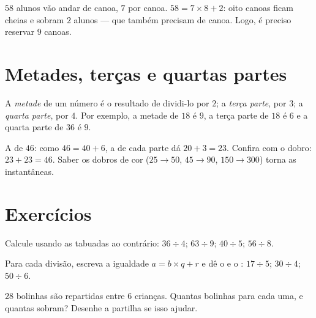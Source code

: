 \begin{example}\label{ex:g3:division:interpret}
$58$ alunos vão andar de canoa, $7$ por canoa. $58 = 7 \times 8 +
2$: oito canoas ficam cheias e sobram $2$ alunos --- que também
precisam de canoa. Logo, é preciso reservar $9$ canoas.
\end{example}

\section{Metades, terças e quartas partes}

\begin{definition}\label{def:g3:division:half}
A \emph{metade} de um número é o resultado de dividi-lo por $2$; a
\emph{terça parte}, por $3$; a \emph{quarta parte}, por $4$. Por
exemplo, a metade de $18$ é $9$, a terça parte de $18$ é $6$ e a
quarta parte de $36$ é $9$.
\end{definition}

\begin{example}\label{ex:g3:division:double}
A  de $46$: como $46 = 40 + 6$, a  de cada parte dá
$20 + 3 = 23$. Confira com o dobro: $23 + 23 = 46$. Saber os dobros
de cor ($25 \to 50$, $45 \to 90$, $150 \to 300$) torna as 
instantâneas.
\end{example}

\section{Exercícios}

\begin{exercise}[$\star$]\label{exo:g3:division:1}
Calcule usando as tabuadas ao contrário: $36 \div 4$; \quad
$63 \div 9$; \quad $40 \div 5$; \quad $56 \div 8$.
\end{exercise}

\begin{exercise}[$\star$]\label{exo:g3:division:2}
Para cada divisão, escreva a igualdade $a = b \times q + r$ e dê o
 e o : $17 \div 5$; \quad $30 \div 4$; \quad
$50 \div 6$.
\end{exercise}

\begin{exercise}[$\star$]\label{exo:g3:division:3}
$28$ bolinhas são repartidas entre $6$ crianças. Quantas bolinhas
para cada uma, e quantas sobram? Desenhe a partilha se isso ajudar.
\end{exercise}

